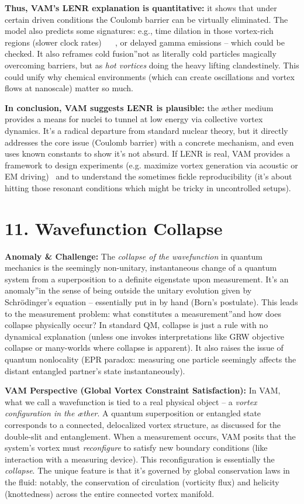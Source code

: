 \documentclass[a4paper, aps,preprint,superscriptaddress, 12pt]{revtex4}
\begin{document}
\textbf{Thus, VAM's LENR explanation is quantitative:} it shows that under certain driven conditions the Coulomb barrier can be virtually eliminated. The model also predicts some signatures: e.g., time dilation in those vortex-rich regions (slower clock rates)~\cite{Iskandarani2025a} ~\cite{Iskandarani2025a} , or delayed gamma emissions – which could be checked. It also reframes \grqq cold fusion\textquotedblright not as literally cold particles magically overcoming barriers, but as \textit{hot vortices} doing the heavy lifting clandestinely. This could unify why chemical environments (which can create oscillations and vortex flows at nanoscale) matter so much.


\textbf{In conclusion, VAM suggests LENR is plausible:} the æther medium provides a means for nuclei to tunnel at low energy via collective vortex dynamics. It's a radical departure from standard nuclear theory, but it directly addresses the core issue (Coulomb barrier) with a concrete mechanism, and even uses known constants to show it's not absurd. If LENR is real, VAM provides a framework to design experiments (e.g. maximize vortex generation via acoustic or EM driving)~\cite{Iskandarani2025a}  and to understand the sometimes fickle reproducibility (it's about hitting those resonant conditions which might be tricky in uncontrolled setups).


\section*{11. Wavefunction Collapse}

\textbf{Anomaly \& Challenge: } The \textit{collapse of the wavefunction} in quantum mechanics is the seemingly non-unitary, instantaneous change of a quantum system from a superposition to a definite eigenstate upon measurement. It's an \grqq anomaly\textquotedblright in the sense of being outside the unitary evolution given by Schrödinger's equation – essentially put in by hand (Born's postulate). This leads to the measurement problem: what constitutes a \grqq measurement\textquotedblright and how does collapse physically occur? In standard QM, collapse is just a rule with no dynamical explanation (unless one invokes interpretations like GRW objective collapse or many-worlds where collapse is apparent). It also raises the issue of quantum nonlocality (EPR paradox: measuring one particle seemingly affects the distant entangled partner's state instantaneously).


\textbf{VAM Perspective (Global Vortex Constraint Satisfaction):} In VAM, what we call a wavefunction is tied to a real physical object – a \textit{vortex configuration in the æther}. A quantum superposition or entangled state corresponds to a connected, delocalized vortex structure, as discussed for the double-slit and entanglement. When a measurement occurs, VAM posits that the system's vortex must \textit{reconfigure} to satisfy new boundary conditions (like interaction with a measuring device). This reconfiguration is essentially the \textit{collapse}. The unique feature is that it's governed by global conservation laws in the fluid: notably, the conservation of circulation (vorticity flux) and helicity (knottedness) across the entire connected vortex manifold.
\end{document}
